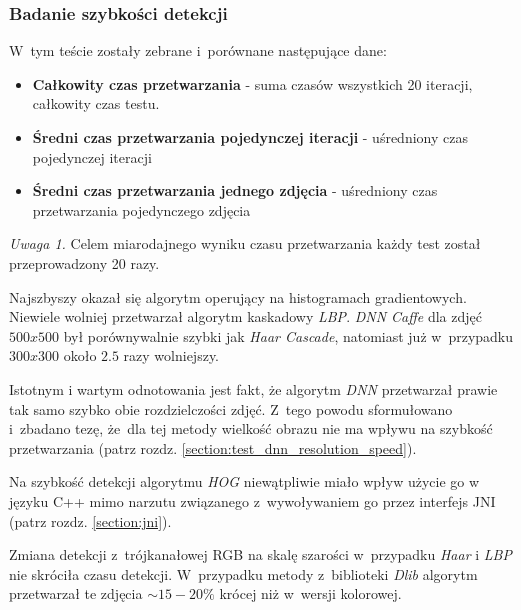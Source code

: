\subsubsection{Badanie szybkości detekcji}

W~tym teście zostały zebrane i~porównane następujące dane:

\begin{itemize}
    \item \textbf{Całkowity czas przetwarzania} - suma czasów wszystkich 20 iteracji, całkowity czas testu.
    \item \textbf{Średni czas przetwarzania pojedynczej iteracji} - uśredniony czas pojedynczej iteracji
    \item \textbf{Średni czas przetwarzania jednego zdjęcia} - uśredniony czas przetwarzania pojedynczego zdjęcia
\end{itemize}

\par
\textit{Uwaga 1.}\label{uwaga:ilosc_powtorzen} Celem miarodajnego wyniku czasu przetwarzania każdy test został przeprowadzony 20 razy.

\vspace{10mm}




Najszbyszy okazał się algorytm operujący na histogramach gradientowych. Niewiele wolniej przetwarzał algorytm kaskadowy \textit{LBP}. \textit{DNN Caffe} dla zdjęć $500x500$  był porównywalnie szybki jak \textit{Haar Cascade}, natomiast już w~przypadku $300x300$ około $2.5$ razy wolniejszy.

\par

Istotnym i wartym odnotowania jest fakt, że algorytm \textit{DNN} przetwarzał prawie tak samo szybko obie rozdzielczości zdjęć. Z~tego powodu sformułowano i~zbadano tezę, że~dla tej metody wielkość obrazu nie ma wpływu na szybkość przetwarzania (patrz rozdz. \ref{section:test_dnn_resolution_speed}).

\par
Na szybkość detekcji algorytmu \textit{HOG} niewątpliwie miało wpływ użycie go w języku C++ mimo narzutu związanego z~wywoływaniem go przez interfejs JNI (patrz rozdz. \ref{section:jni}).

\vspace{5mm}

Zmiana detekcji z~trójkanałowej RGB na skalę szarości w~przypadku \textit{Haar} i \textit{LBP} nie skróciła czasu detekcji. W~przypadku metody z~biblioteki \textit{Dlib} algorytm przetwarzał te zdjęcia $\sim15-20 \%$ krócej niż w~wersji kolorowej.





